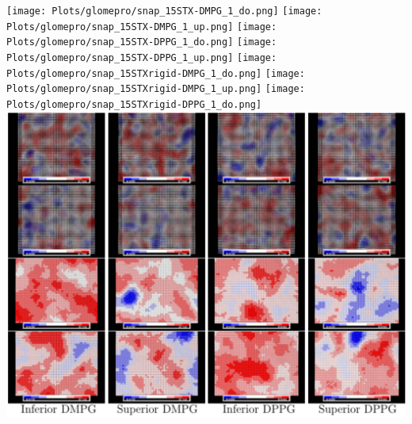 \begin{center}
\texttt{[image: Plots/glomepro/snap\_15STX-DMPG\_1\_do.png]}
\texttt{[image: Plots/glomepro/snap\_15STX-DMPG\_1\_up.png]}
\texttt{[image: Plots/glomepro/snap\_15STX-DPPG\_1\_do.png]}
\texttt{[image: Plots/glomepro/snap\_15STX-DPPG\_1\_up.png]}
\texttt{[image: Plots/glomepro/snap\_15STXrigid-DMPG\_1\_do.png]}
\texttt{[image: Plots/glomepro/snap\_15STXrigid-DMPG\_1\_up.png]}
\texttt{[image: Plots/glomepro/snap\_15STXrigid-DPPG\_1\_do.png]}
\includegraphics[resolution=100,scale=0.5]{Plots/glomepro/apl_glomepro_1.png}
\end{center} 
